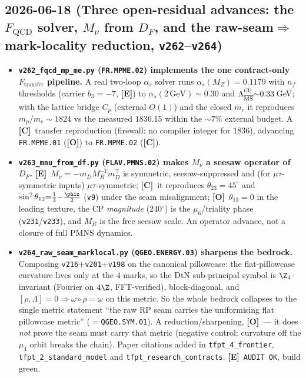 \documentclass[11pt]{article}
\providecommand{\mE}{\textbf{[E]}}\providecommand{\mC}{\textbf{[C]}}
\providecommand{\mO}{\textbf{[O]}}\providecommand{\mX}{\textbf{[X]}}
\providecommand{\vref}[1]{\texttt{#1}}
\begin{document}
\subsection*{2026-06-18 (Three open-residual advances: the $F_{\mathrm{QCD}}$ solver, $M_\nu$ from $D_F$, and the raw-seam$\Rightarrow$mark-locality reduction, \texttt{v262}--\texttt{v264})}
\begin{itemize}
\item \textbf{\texttt{v262\_fqcd\_mp\_me.py} (\texttt{FR.MPME.02}) implements the one contract-only
  $F_{\mathrm{transfer}}$ pipeline.} A real two-loop $\alpha_s$ solver runs $\alpha_s(M_Z){=}0.1179$ with
  $n_f$ thresholds (carrier $b_3{=}-7$, \mE) to $\alpha_s(2\,\text{GeV}){\sim}0.30$ and
  $\Lambda^{(3)}_{\overline{\rm MS}}{\sim}0.33$\,GeV; with the lattice bridge $C_p$ (external $O(1)$) and the
  closed $m_e$ it reproduces $m_p/m_e{\sim}1824$ vs the measured $1836.15$ within the $\sim7\%$ external
  budget. A \mC\ transfer reproduction (firewall: no compiler integer for $1836$), advancing
  \texttt{FR.MPME.01} (\mO) to \texttt{FR.MPME.02} (\mC).
\item \textbf{\texttt{v263\_mnu\_from\_df.py} (\texttt{FLAV.PMNS.02}) makes $M_\nu$ a seesaw operator of
  $D_F$.} \mE\ $M_\nu=-m_D M_R^{-1} m_D^\top$ is symmetric, seesaw-suppressed and (for $\mu\tau$-symmetric
  inputs) $\mu\tau$-symmetric; \mC\ it reproduces $\theta_{23}{=}45^\circ$ and
  $\sin^2\theta_{12}{=}\tfrac13{-}\tfrac{\phiz}{2}$ (\vref{v9}) under the seam misalignment; \mO\
  $\theta_{13}{=}0$ in the leading texture, the CP \emph{magnitude} ($240^\circ$) is the $\mu_6$/triality
  phase (\vref{v231}/\vref{v233}), and $M_R$ is the free seesaw scale. An operator advance, not a closure
  of full PMNS dynamics.
\item \textbf{\texttt{v264\_raw\_seam\_marklocal.py} (\texttt{QGEO.ENERGY.03}) sharpens the bedrock.}
  Composing \vref{v216}$+$\vref{v201}$+$\vref{v198} on the canonical pillowcase: the flat-pillowcase
  curvature lives only at the $4$ marks, so the DtN sub-principal symbol is $\Z_4$-invariant (Fourier on
  $4\Z$, FFT-verified), block-diagonal, and $[\rho,\Lambda]{=}0\Rightarrow\omega\circ\rho{=}\omega$ on this
  metric. So the whole bedrock collapses to the single metric statement ``the raw RP seam carries the
  uniformising flat pillowcase metric'' ($=$\texttt{QGEO.SYM.01}). A reduction/sharpening, \mO\ --- it does
  \emph{not} prove the seam must carry that metric (negative control: curvature off the $\mu_4$ orbit breaks
  the chain). Paper citations added in \texttt{tfpt\_4\_frontier}, \texttt{tfpt\_2\_standard\_model} and
  \texttt{tfpt\_research\_contracts}. \mE\ \texttt{AUDIT OK}, build green.
\end{itemize}
\end{document}
